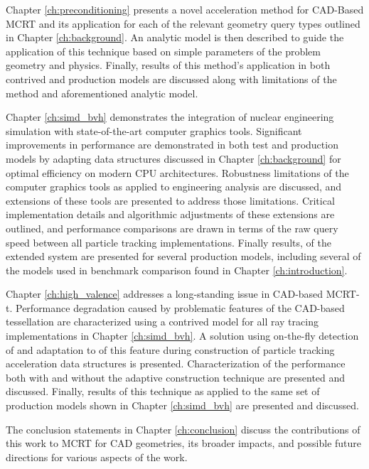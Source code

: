Chapter \ref{ch:preconditioning} presents a novel acceleration method for
CAD-Based MCRT and its application for each of the relevant geometry query types
outlined in Chapter \ref{ch:background}. An analytic model is then described to
guide the application of this technique based on simple parameters of the problem geometry
and physics. Finally, results of this
method's application in both contrived and production models are discussed along
with limitations of the method and aforementioned analytic model.

Chapter \ref{ch:simd_bvh} demonstrates the integration of nuclear engineering
simulation with state-of-the-art computer graphics tools. Significant
improvements in performance are demonstrated in both test and production models
by adapting data structures discussed in Chapter \ref{ch:background} for optimal
efficiency on modern CPU architectures. Robustness limitations of the computer
graphics tools as applied to engineering analysis are discussed, and extensions
of these tools are presented to address those limitations. Critical
implementation details and algorithmic adjustments of these extensions are
outlined, and performance comparisons are drawn in terms of the raw query speed
between all particle tracking implementations. Finally results, of the extended
system are presented for several production models, including several of the
models used in benchmark comparison found in Chapter \ref{ch:introduction}.

Chapter \ref{ch:high_valence} addresses a long-standing issue in CAD-based
MCRT-t. Performance degradation caused by problematic features of the CAD-based
tessellation are characterized using a contrived model for all ray tracing
implementations in Chapter \ref{ch:simd_bvh}. A solution using on-the-fly
detection of and adaptation to of this feature during construction of particle
tracking acceleration data structures is presented. Characterization of the
performance both with and without the adaptive construction technique are
presented and discussed. Finally, results of this technique as applied to the
same set of production models shown in Chapter \ref{ch:simd_bvh} are presented
and discussed.

The conclusion statements in Chapter \ref{ch:conclusion} discuss the
contributions of this work to MCRT for CAD geometries, its broader impacts, and
possible future directions for various aspects of the work.
